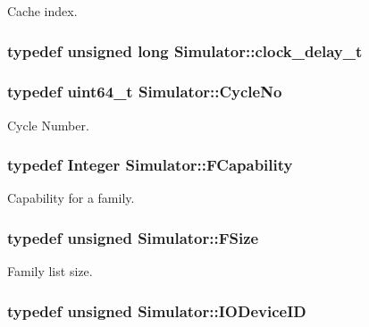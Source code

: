 Cache index. 

\hypertarget{namespace_simulator_a6dba9f13bee6216957a1babe62111de8}{
\subsubsection[{clock\+\_\+delay\+\_\+t}]{\setlength{\rightskip}{0pt plus 5cm}typedef unsigned long {\bf Simulator\+::clock\+\_\+delay\+\_\+t}}}\label{namespace_simulator_a6dba9f13bee6216957a1babe62111de8}
\hypertarget{namespace_simulator_a928f1e2101eba21bb0fe409e8c9ce573}{
\subsubsection[{Cycle\+No}]{\setlength{\rightskip}{0pt plus 5cm}typedef uint64\+\_\+t {\bf Simulator\+::\+Cycle\+No}}}\label{namespace_simulator_a928f1e2101eba21bb0fe409e8c9ce573}


Cycle Number. 

\hypertarget{namespace_simulator_a607aa9969bfe2711861ae21f42c37c59}{
\subsubsection[{F\+Capability}]{\setlength{\rightskip}{0pt plus 5cm}typedef Integer {\bf Simulator\+::\+F\+Capability}}}\label{namespace_simulator_a607aa9969bfe2711861ae21f42c37c59}


Capability for a family. 

\hypertarget{namespace_simulator_a06544009313d7c13d411b1c074e5acff}{
\subsubsection[{F\+Size}]{\setlength{\rightskip}{0pt plus 5cm}typedef unsigned {\bf Simulator\+::\+F\+Size}}}\label{namespace_simulator_a06544009313d7c13d411b1c074e5acff}


Family list size. 

\hypertarget{namespace_simulator_a3493d987c866ad6b8aaa704c42502db0}{
\subsubsection[{I\+O\+Device\+I\+D}]{\setlength{\rightskip}{0pt plus 5cm}typedef unsigned {\bf Simulator\+::\+I\+O\+Device\+I\+D}}}\label{namespace_simulator_a3493d987c866ad6b8aaa704c42502db0}


